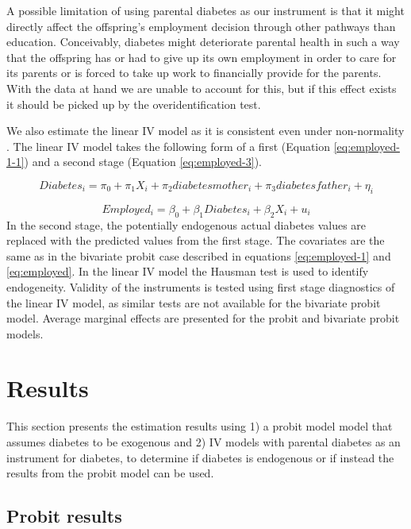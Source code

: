A possible limitation of using parental diabetes as our
instrument is that it might directly affect the offspring's employment
decision through other pathways than education. Conceivably, diabetes
might deteriorate parental health in such a way that the offspring
has or had to give up its own employment in order to care for its
parents or is forced to take up work to financially provide for the
parents. With the data at hand we are unable to account for this,
but if this effect exists it should be picked up by the overidentification
test. 

We also estimate the linear \ac{IV} model
as it is consistent even under non-normality \parencite{Angrist2009a}.
The linear \ac{IV} model takes the following form of a first (Equation
\ref{eq:employed-1-1}) and a second stage (Equation \ref{eq:employed-3}).


\begin{equation}
Diabetes_{i}=\pi_{0}+\pi_{1}X_{i}+\pi_{2}diabetesmother_{i}+\pi_{3}diabetesfather_{i}+\eta_{i}\label{eq:employed-1-1}
\end{equation}



\begin{equation}
Employed_{i}=\beta_{0}+\beta_{1}Diabetes_{i}+\beta_{2}X_{i}+u_{i}\label{eq:employed-3}
\end{equation}
In the second stage, the potentially endogenous actual diabetes values
are replaced with the predicted values from the first stage. The covariates
are the same as in the bivariate probit case described in equations
\ref{eq:employed-1} and \ref{eq:employed}. In the linear \ac{IV}
model the Hausman test is used to identify endogeneity. Validity of
the instruments is tested using first stage diagnostics of the linear
\ac{IV} model, as similar tests are not available for the bivariate
probit model. Average marginal effects are presented for the probit and bivariate probit models. 


\section{\label{sec:RESULTS}Results}

This section presents the estimation results using 1) a
probit model model that assumes diabetes to be exogenous and 2) \ac{IV}
models with parental diabetes as an instrument for diabetes, to determine
if diabetes is endogenous or if instead the results from the probit
model can be used. 


\subsection{\label{sub:Probit-estimation}Probit results}

